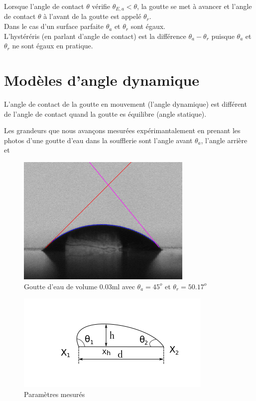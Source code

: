 \documentclass[french]{article}
\begin{document}
Lorsque l'angle de contact $\theta$ vérifie $\theta_{E,a} < \theta$, la goutte se met à avancer et l'angle de contact $\theta$ à l'avant de la goutte est appelé $\theta_{r}$.\\

Dans le cas d'un surface parfaite $\theta_{a}$ et $\theta_{r}$ sont égaux.\\

L'hystéréris (en parlant d'angle de contact) est la différence $\theta_{a}-\theta_{r}$ puisque $\theta_{a}$ et $\theta_{r}$ ne sont égaux en pratique.

\section{Modèles d'angle dynamique}

L'angle de contact de la goutte en mouvement (l'angle dynamique) est différent de l'angle de contact quand la goutte es équilibre (angle statique).



Les grandeurs que nous avançons mesurées expérimantalement en prenant les photos d'une goutte d'eau dans la soufflerie sont l'angle avant $\theta_{a}$, l'angle arrière et 



\begin{figure}[ht]
	\centering
	\includegraphics[scale = 0.6]{./image/crop_tvitesse=28_volume=003.png}
	\caption{Goutte d'eau de volume $0.03$ml avec $\theta_{a} = 45^{o}$ et $\theta_{r} = 50.17^{o}$}
\end{figure}

\begin{figure}[ht]
	\centering
	\includegraphics[scale = 1]{./image/rrgou2.png}
	\caption{Paramètres mesurés}
\end{figure}
\end{document}
